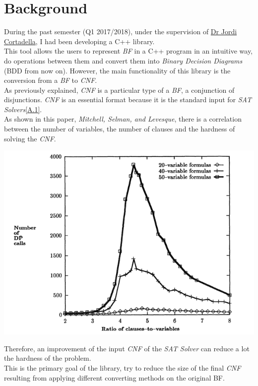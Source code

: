 \section{Background}

During the past semester (Q1 2017/2018), under the supervision of \href{https://www.cs.upc.edu/~jordicf/}{Dr Jordi Cortadella}, I had been developing a C++ library.\\
This tool allows the users to represent \emph{BF} in a C++ program in an intuitive way, do operations between them and convert them into \emph{Binary Decision Diagrams} (BDD from now on). However, the main functionality of this library is the conversion from a \emph{BF} to \emph{CNF}.  \\
As previously explained, \emph{CNF} is a particular type of a \emph{BF}, a conjunction of disjunctions. \emph{CNF} is an essential format because it is the standard input for \emph{SAT Solvers}\ref{A.1}.\\
As shown in this paper, \emph{Mitchell, Selman, and Levesque\cite{Mitchell}}, there is a correlation between the number of variables, the number of clauses and the hardness of solving the \emph{CNF}.
\begin{center}
	\includegraphics[width=1\textwidth]{Figures/GraphMitchellSelmanLevesque.png}
\end{center}
Therefore, an improvement of the input \emph{CNF} of the \emph{SAT Solver} can reduce a lot the hardness of the problem. \\
This is the primary goal of the library, try to reduce the size of the final \emph{CNF} resulting from applying different converting methods on the original BF.

